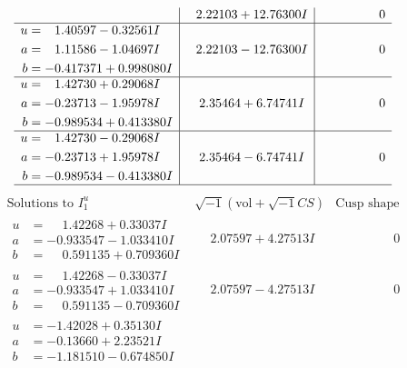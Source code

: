 \documentclass[1p]{elsarticle_modified}
\theoremstyle{definition}
\newcommand{\I}{\sqrt{-1}}
\begin{document}
$$\begin{array}{c|c|c}
 & \phantom{-}2.22103 + 12.76300 I & \phantom{-0.000000 } 0 \\ \hline\begin{aligned}
u &= \phantom{-}1.40597 - 0.32561 I \\
a &= \phantom{-}1.11586 - 1.04697 I \\
b &= -0.417371 + 0.998080 I\end{aligned}
 & \phantom{-}2.22103 - 12.76300 I & \phantom{-0.000000 } 0 \\ \hline\begin{aligned}
u &= \phantom{-}1.42730 + 0.29068 I \\
a &= -0.23713 - 1.95978 I \\
b &= -0.989534 + 0.413380 I\end{aligned}
 & \phantom{-}2.35464 + 6.74741 I & \phantom{-0.000000 } 0 \\ \hline\begin{aligned}
u &= \phantom{-}1.42730 - 0.29068 I \\
a &= -0.23713 + 1.95978 I \\
b &= -0.989534 - 0.413380 I\end{aligned}
 & \phantom{-}2.35464 - 6.74741 I & \phantom{-0.000000 } 0\\
 \hline 
 \end{array}$$\newpage$$\begin{array}{c|c|c}  
\text{Solutions to }I^u_{1}& \I (\text{vol} + \sqrt{-1}CS) & \text{Cusp shape}\\
 \hline 
\begin{aligned}
u &= \phantom{-}1.42268 + 0.33037 I \\
a &= -0.933547 - 1.033410 I \\
b &= \phantom{-}0.591135 + 0.709360 I\end{aligned}
 & \phantom{-}2.07597 + 4.27513 I & \phantom{-0.000000 } 0 \\ \hline\begin{aligned}
u &= \phantom{-}1.42268 - 0.33037 I \\
a &= -0.933547 + 1.033410 I \\
b &= \phantom{-}0.591135 - 0.709360 I\end{aligned}
 & \phantom{-}2.07597 - 4.27513 I & \phantom{-0.000000 } 0 \\ \hline\begin{aligned}
u &= -1.42028 + 0.35130 I \\
a &= -0.13660 + 2.23521 I \\
b &= -1.181510 - 0.674850 I\end{aligned}

\end{array}$$
\end{document}
